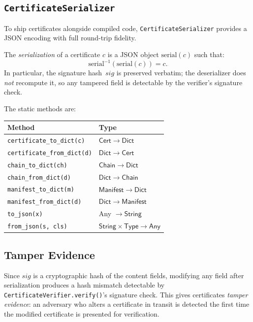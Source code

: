 \documentclass[11pt]{article}
\newcommand{\Cert}{\mathsf{Cert}}              %
\newcommand{\Chain}{\mathsf{Chain}}            %
\newcommand{\certsig}{\mathit{sig}}            %
\newcommand{\serial}{\mathrm{serial}}          %
\begin{document}
\subsection{\texttt{CertificateSerializer}}

To ship certificates alongside compiled code, \texttt{CertificateSerializer}
provides a JSON encoding with full round-trip fidelity.

\begin{definition}[Serialization]\label{def:serial}
The \emph{serialization} of a certificate $c$ is a JSON object
$\serial(c)$ such that:
\[
  \serial^{-1}(\serial(c)) = c.
\]
In particular, the signature hash~$\certsig$ is preserved verbatim;
the deserializer does \emph{not} recompute it, so any tampered
field is detectable by the verifier's signature check.
\end{definition}

The static methods are:
\begin{center}
\begin{tabular}{ll}
\toprule
\textbf{Method} & \textbf{Type} \\
\midrule
\texttt{certificate\_to\_dict(c)}        & $\Cert \to \mathsf{Dict}$ \\
\texttt{certificate\_from\_dict(d)}      & $\mathsf{Dict} \to \Cert$ \\
\texttt{chain\_to\_dict(ch)}             & $\Chain \to \mathsf{Dict}$ \\
\texttt{chain\_from\_dict(d)}            & $\mathsf{Dict} \to \Chain$ \\
\texttt{manifest\_to\_dict(m)}           & $\mathsf{Manifest} \to \mathsf{Dict}$ \\
\texttt{manifest\_from\_dict(d)}         & $\mathsf{Dict} \to \mathsf{Manifest}$ \\
\texttt{to\_json(x)}                     & Any $\to \mathsf{String}$ \\
\texttt{from\_json(s, cls)}              & $\mathsf{String} \times \mathsf{Type} \to \mathsf{Any}$ \\
\bottomrule
\end{tabular}
\end{center}

\subsection{Tamper Evidence}

Since $\certsig$ is a cryptographic hash of the content fields,
modifying any field after serialization produces a hash mismatch
detectable by \texttt{CertificateVerifier.verify()}'s signature check.
This gives certificates \emph{tamper evidence}: an adversary who alters
a certificate in transit is detected the first time the modified
certificate is presented for verification.
\end{document}
